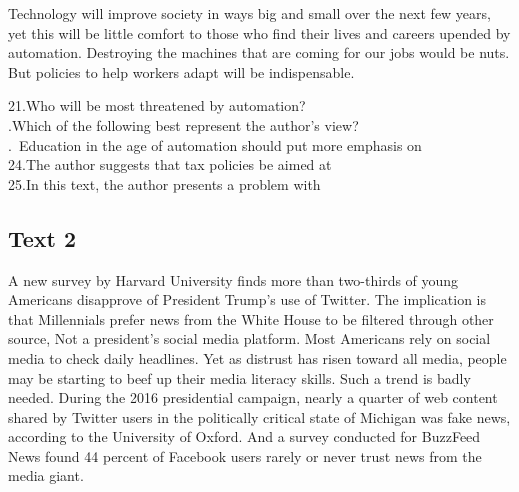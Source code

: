 Technology will improve society in ways big and small over the next few years, yet this will be little comfort to those who find their lives and careers upended by automation. 
Destroying the machines that are coming for our jobs would be nuts. But policies to help workers adapt will be indispensable.
\begin{questions} \question 21.Who will be most threatened by automation?
\\  .Which of the following best represent the author’s view?
\\ . Education in the age of automation should put more emphasis on
\\ \question 24.The author suggests that tax policies be aimed at
\\ \question 25.In this text, the author presents a problem with
\\ \end{questions}      \subsection{Text 2}
A new survey by Harvard University finds more than two-thirds of young Americans disapprove of President Trump’s use of Twitter. The implication is that Millennials prefer news from the White House to be filtered through other source, Not a president’s social media platform.
Most Americans rely on social media to check daily headlines. Yet as distrust has risen toward all media, people may be starting to beef up their media literacy skills. Such a trend is badly needed. During the 2016 presidential campaign, nearly a quarter of web content shared by Twitter users in the politically critical state of Michigan was fake news, according to the University of Oxford. And a survey conducted for BuzzFeed News found 44 percent of Facebook users rarely or never trust news from the media giant.

